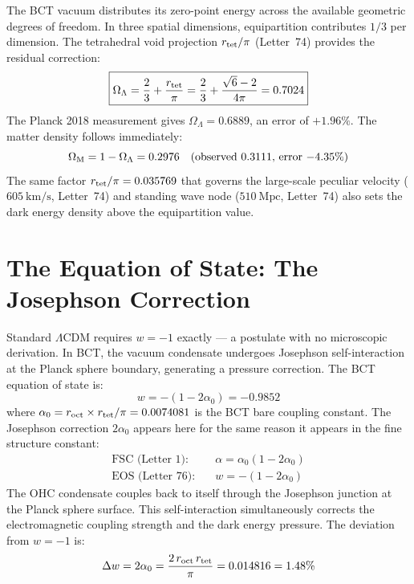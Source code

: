 \documentclass[aps,prl,twocolumn,showpacs,superscriptaddress]{revtex4-2}
\begin{document}
The BCT vacuum distributes its zero-point energy across the available geometric 
degrees of freedom. In three spatial dimensions, equipartition contributes $1/3$ 
per dimension. The tetrahedral void projection $r_{\rm tet}/\pi$ (Letter~74) 
provides the residual correction:
\begin{equation}
    \boxed{\Omega_\Lambda = \frac{2}{3} + \frac{r_{\rm tet}}{\pi} 
    = \frac{2}{3} + \frac{\sqrt{6}-2}{4\pi} = 0.7024}
\end{equation}
The Planck 2018 measurement gives $\Omega_\Lambda = 0.6889$, an error of $+1.96\%$.
The matter density follows immediately:
\begin{equation}
    \Omega_{\rm M} = 1 - \Omega_\Lambda = 0.2976
    \quad \text{(observed } 0.3111\text{, error } {-4.35\%)}
\end{equation}
The same factor $r_{\rm tet}/\pi = 0.035769$ that governs the large-scale peculiar 
velocity ($605~\text{km/s}$, Letter~74) and standing wave node ($510~\text{Mpc}$, 
Letter~74) also sets the dark energy density above the equipartition value.

\section{The Equation of State: The Josephson Correction}

Standard $\Lambda$CDM requires $w = -1$ exactly --- a postulate with no microscopic 
derivation. In BCT, the vacuum condensate undergoes Josephson self-interaction at the 
Planck sphere boundary, generating a pressure correction. The BCT equation of state is:
\begin{equation}
    \boxed{w = -(1 - 2\alpha_0) = -0.9852}
\end{equation}
where $\alpha_0 = r_{\rm oct} \times r_{\rm tet}/\pi = 0.0074081$ is the BCT bare 
coupling constant. The Josephson correction $2\alpha_0$ appears here for the same 
reason it appears in the fine structure constant:
\begin{align}
    \text{FSC (Letter 1):}\quad &\alpha = \alpha_0(1-2\alpha_0) \\
    \text{EOS (Letter 76):}\quad &w = -(1-2\alpha_0)
\end{align}
The OHC condensate couples back to itself through the Josephson junction at the 
Planck sphere surface. This self-interaction simultaneously corrects the 
electromagnetic coupling strength and the dark energy pressure. The deviation 
from $w=-1$ is:
\begin{equation}
    \Delta w = 2\alpha_0 = \frac{2\,r_{\rm oct}\,r_{\rm tet}}{\pi} = 0.014816 
    = 1.48\%
\end{equation}
\end{document}
